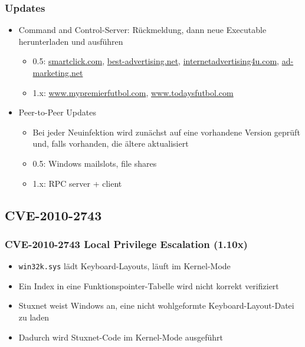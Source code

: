 \documentclass{beamer}
\begin{document}
\begin{frame}
  \frametitle{Updates}
  \begin{itemize}
    \item Command and Control-Server: Rückmeldung, dann neue Executable herunterladen und ausführen
      \begin{itemize}
        \item 0.5: \url{smartclick.com}, \url{best-advertising.net}, \url{internetadvertising4u.com}, \url{ad-marketing.net}
        \item 1.x: \url{www.mypremierfutbol.com}, \url{www.todaysfutbol.com}
      \end{itemize}
    \item Peer-to-Peer Updates
      \begin{itemize}
        \item Bei jeder Neuinfektion wird zunächst auf eine vorhandene Version geprüft und, falls vorhanden, die ältere aktualisiert
        \item 0.5: Windows mailslots, file shares
        \item 1.x: RPC server + client
      \end{itemize}
  \end{itemize}
\end{frame}

\subsection{CVE-2010-2743}

\begin{frame}
  \frametitle{CVE-2010-2743 Local Privilege Escalation (1.10x)}
  \begin{itemize}
    \item \texttt{win32k.sys} lädt Keyboard-Layouts, läuft im Kernel-Mode
    \item Ein Index in eine Funktionspointer-Tabelle wird nicht korrekt verifiziert
    \item Stuxnet weist Windows an, eine nicht wohlgeformte Keyboard-Layout-Datei zu laden
    \item Dadurch wird Stuxnet-Code im Kernel-Mode ausgeführt
  \end{itemize}
\end{frame}
\end{document}

